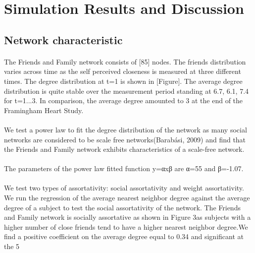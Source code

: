 \documentclass[11pt]{article}
\begin{document}
\section{Simulation Results and Discussion}

\subsection{Network characteristic}
\paragraph{}
The Friends and Family network consists of [85] nodes. The friends distribution varies across time as the self perceived closeness is measured at three different times. The degree distribution at t=1 is shown in [Figure]. The average degree distribution is quite stable over the measurement period standing at 6.7, 6.1, 7.4 for t=1...3. In comparison, the average degree amounted to 3 at the end of the Framingham Heart Study.

\paragraph{}
We test a power law to fit the degree distribution of the network as many social networks are considered to be scale free networks(Barabási, 2009) and find that the Friends and Family network exhibits characteristics of a scale-free network.


\paragraph{}
The parameters of the power law fitted function y=αxβ are α=55 and β=-1.07.

\paragraph{}
We test two types of assortativity: social assortativity and weight assortativity. We run the regression of the average nearest neighbor degree against the average degree of a subject to test the social assortativity of the network. The Friends and Family network is socially assortative as shown in Figure 3as subjects with a higher number of close friends tend to have a higher nearest neighbor degree.We find a positive coefficient on the average degree equal to 0.34 and significant at the 5%


\end{document}
